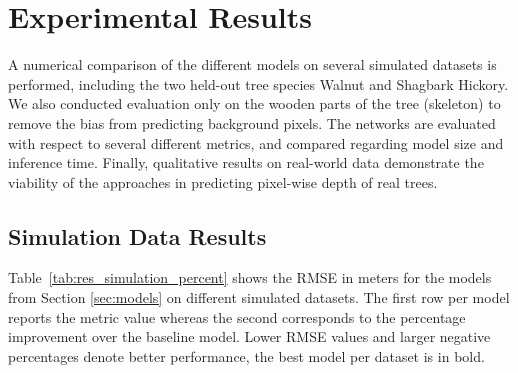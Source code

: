 \section{Experimental Results} %
A numerical comparison of the different models on several simulated datasets is performed, including the two held-out tree species Walnut and Shagbark Hickory. We also conducted evaluation only on the wooden parts of the tree (skeleton) to remove the bias from predicting background pixels. The networks are evaluated with respect to several different metrics, and compared regarding model size and inference time. Finally, qualitative results on real-world data demonstrate the viability of the approaches in predicting pixel-wise depth of real trees.

\subsection{Simulation Data Results}  %


Table~\ref{tab:res_simulation_percent} shows the RMSE in meters for the models from Section \mbox{\ref{sec:models}} on different simulated datasets. The first row per model reports the metric value whereas the second corresponds to the percentage improvement over the baseline model. Lower RMSE values and larger negative percentages denote better performance, the best model per dataset is in bold. 



